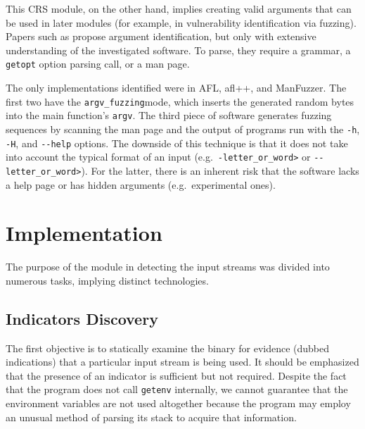 \documentclass[../main.tex]{subfiles}
\begin{document}
This CRS module, on the other hand, implies creating valid arguments
that can be used in later modules (for example, in vulnerability
identification via fuzzing). Papers such as \cite{cli_fuzzer}\cite{nt_robustness}\cite{power} propose argument
identification, but only with extensive understanding of the
investigated software. To parse, they require a grammar, a
\texttt{getopt} option parsing call, or a man page.

The only implementations identified were in AFL, afl++, and ManFuzzer.
The first two have the \texttt{argv\_fuzzing\textquotesingle{}}mode,
which inserts the generated random bytes into the main function's
\texttt{argv}. The third piece of software generates fuzzing sequences
by scanning the man page and the output of programs run with the
\texttt{-h}, \texttt{-H}, and \texttt{-\/-help} options. The downside of
this technique is that it does not take into account the typical format
of an input (e.g.~\texttt{-letter\_or\_word\textgreater{}} or
\texttt{-\/-letter\_or\_word\textgreater{}}). For the latter, there is
an inherent risk that the software lacks a help page or has hidden
arguments (e.g.~experimental ones).

\hypertarget{implementation}{%
\section{Implementation}\label{implementation}}

The purpose of the module in detecting the input streams was divided
into numerous tasks, implying distinct technologies.

\hypertarget{indicators-discovery}{%
\subsection{Indicators Discovery}\label{indicators-discovery}}

The first objective is to statically examine the binary for evidence
(dubbed indications) that a particular input stream is being used. It
should be emphasized that the presence of an indicator is sufficient but
not required. Despite the fact that the program does not call
\texttt{getenv} internally, we cannot guarantee that the environment
variables are not used altogether because the program may employ an
unusual method of parsing its stack to acquire that information.
\end{document}
